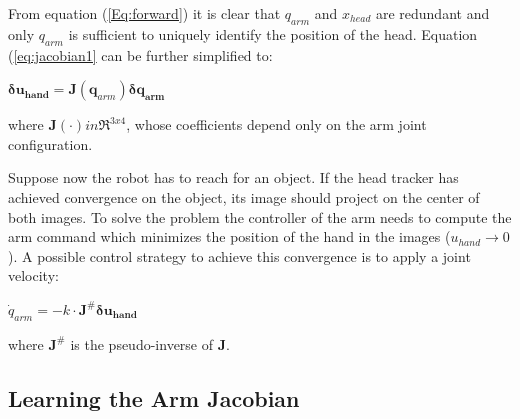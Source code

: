 From equation (\ref{Eq:forward}) it is clear that 
$q_{arm}$ and $x_{head}$ are redundant and only $q_{arm}$ is 
sufficient to uniquely identify the position of the head. Equation
(\ref{eq:jacobian1} can be further simplified to:
%
\begin{center} 
\begin{math}
\label{eq:jacobian3}
  \mathbf{\delta u_{hand}}=
  \mathbf J\left(\mathbf q_{arm}\right)
  \mathbf{\delta q_{arm}}
\end{math}
\end{center}
%
where $\mathbf J(\cdot) in \mathbb \Re^{3x4}$, whose coefficients depend 
only on the arm joint configuration.

Suppose now the robot has to reach for an object. If the head tracker
has achieved convergence on the object, its image should project on 
the center of both images. To solve the problem the controller of the 
arm needs to compute the arm command which minimizes the position of the
hand in the images ($u_{hand} \rightarrow 0$). A possible control strategy
to achieve this convergence is to apply a joint velocity:
%
\begin{center}
\begin{math}
\dot q_{arm}=-k \cdot \mathbf J^{\#} \mathbf{\delta u_{hand}}
\end{math}
\end{center}
%
where $\mathbf J^{\#}$ is the pseudo-inverse of $\mathbf J$.

\subsection{Learning the Arm Jacobian}
%